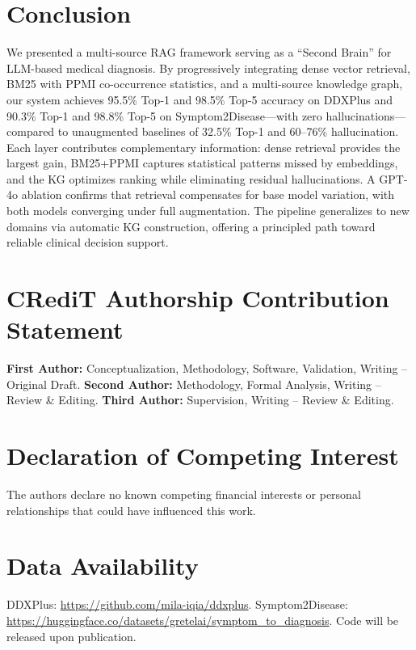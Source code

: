 \documentclass[preprint,12pt]{elsarticle}
\begin{document}
\section{Conclusion}
\label{sec:conclusion}

We presented a multi-source RAG framework serving as a ``Second Brain'' for LLM-based medical diagnosis. By progressively integrating dense vector retrieval, BM25 with PPMI co-occurrence statistics, and a multi-source knowledge graph, our system achieves 95.5\% Top-1 and 98.5\% Top-5 accuracy on DDXPlus and 90.3\% Top-1 and 98.8\% Top-5 on Symptom2Disease---with zero hallucinations---compared to unaugmented baselines of 32.5\% Top-1 and 60--76\% hallucination. Each layer contributes complementary information: dense retrieval provides the largest gain, BM25+PPMI captures statistical patterns missed by embeddings, and the KG optimizes ranking while eliminating residual hallucinations. A GPT-4o ablation confirms that retrieval compensates for base model variation, with both models converging under full augmentation. The pipeline generalizes to new domains via automatic KG construction, offering a principled path toward reliable clinical decision support.

\section*{CRediT Authorship Contribution Statement}

\textbf{First Author:} Conceptualization, Methodology, Software, Validation, Writing -- Original Draft.
\textbf{Second Author:} Methodology, Formal Analysis, Writing -- Review \& Editing.
\textbf{Third Author:} Supervision, Writing -- Review \& Editing.

\section*{Declaration of Competing Interest}

The authors declare no known competing financial interests or personal relationships that could have influenced this work.

\section*{Data Availability}

DDXPlus: \url{https://github.com/mila-iqia/ddxplus}. Symptom2Disease: \url{https://huggingface.co/datasets/gretelai/symptom_to_diagnosis}. Code will be released upon publication.
\end{document}
